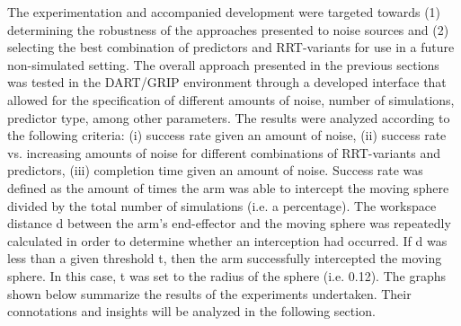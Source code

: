 \documentclass[letterpaper, 10 pt, conference]{ieeeconf}  %
\begin{document}
The experimentation and accompanied development were targeted towards (1)
determining the robustness of the approaches presented to noise sources and (2)
selecting the best combination of predictors and RRT-variants for use in a
future non-simulated setting. The overall approach presented in the previous
sections was tested in the DART/GRIP environment through a developed interface
that allowed for the specification of different amounts of noise, number of
simulations, predictor type, among other parameters.  The results were analyzed
according to the following criteria: (i) success rate given an amount of noise,
(ii) success rate vs. increasing amounts of noise for different combinations of
RRT-variants and predictors, (iii) completion time given an amount of noise.
Success rate was defined as the amount of times the arm was able to intercept
the moving sphere divided by the total number of simulations (i.e. a
percentage). The workspace distance d between the arm’s end-effector and the
moving sphere was repeatedly calculated in order to determine whether an
interception had occurred. If d was less than a given threshold t, then the arm
successfully intercepted the moving sphere. In this case, t was set to the
radius of the sphere (i.e. 0.12).  The graphs shown below summarize the results
of the experiments undertaken. Their connotations and insights will be analyzed
in the following section.
\end{document}
